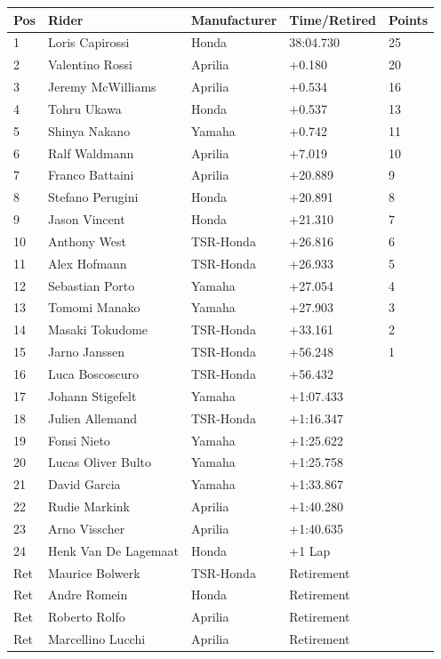 \documentclass{article}
\begin{document}
\begin{tabular}{lllll}
\toprule
Pos & Rider & Manufacturer & Time/Retired & Points \\
\midrule
1 & Loris Capirossi & Honda & 38:04.730 & 25 \\
2 & Valentino Rossi & Aprilia & +0.180 & 20 \\
3 & Jeremy McWilliams & Aprilia & +0.534 & 16 \\
4 & Tohru Ukawa & Honda & +0.537 & 13 \\
5 & Shinya Nakano & Yamaha & +0.742 & 11 \\
6 & Ralf Waldmann & Aprilia & +7.019 & 10 \\
7 & Franco Battaini & Aprilia & +20.889 & 9 \\
8 & Stefano Perugini & Honda & +20.891 & 8 \\
9 & Jason Vincent & Honda & +21.310 & 7 \\
10 & Anthony West & TSR-Honda & +26.816 & 6 \\
11 & Alex Hofmann & TSR-Honda & +26.933 & 5 \\
12 & Sebastian Porto & Yamaha & +27.054 & 4 \\
13 & Tomomi Manako & Yamaha & +27.903 & 3 \\
14 & Masaki Tokudome & TSR-Honda & +33.161 & 2 \\
15 & Jarno Janssen & TSR-Honda & +56.248 & 1 \\
16 & Luca Boscoscuro & TSR-Honda & +56.432 &  \\
17 & Johann Stigefelt & Yamaha & +1:07.433 &  \\
18 & Julien Allemand & TSR-Honda & +1:16.347 &  \\
19 & Fonsi Nieto & Yamaha & +1:25.622 &  \\
20 & Lucas Oliver Bulto & Yamaha & +1:25.758 &  \\
21 & David Garcia & Yamaha & +1:33.867 &  \\
22 & Rudie Markink & Aprilia & +1:40.280 &  \\
23 & Arno Visscher & Aprilia & +1:40.635 &  \\
24 & Henk Van De Lagemaat & Honda & +1 Lap &  \\
Ret & Maurice Bolwerk & TSR-Honda & Retirement &  \\
Ret & Andre Romein & Honda & Retirement &  \\
Ret & Roberto Rolfo & Aprilia & Retirement &  \\
Ret & Marcellino Lucchi & Aprilia & Retirement &  \\
\bottomrule
\end{tabular}
\end{document}
